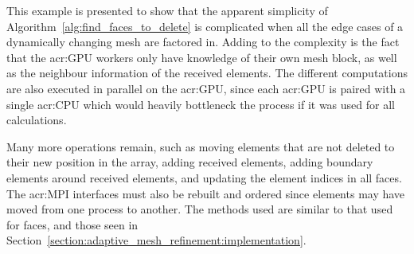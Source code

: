 This example is presented to show that the apparent simplicity of
Algorithm~\ref{alg:find_faces_to_delete} is complicated when all the edge cases of a dynamically
changing mesh are factored in. Adding to the complexity is the fact that the \acrshort{acr:GPU}
workers only have knowledge of their own mesh block, as well as the neighbour information of the
received elements. The different computations are also executed in parallel on the
\acrshort{acr:GPU}, since each \acrshort{acr:GPU} is paired with a single \acrshort{acr:CPU} which
would heavily bottleneck the process if it was used for all calculations.

Many more operations remain, such as moving elements that are not deleted to their new position in
the array, adding received elements, adding boundary elements around received elements, and updating
the element indices in all faces. The \acrshort{acr:MPI} interfaces must also be rebuilt and ordered
since elements may have moved from one process to another. The methods used are similar to that used
for faces, and those seen in Section~\ref{section:adaptive_mesh_refinement:implementation}. 
